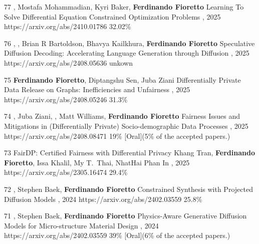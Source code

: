 \begin{pubs}


\confentry
	{77}
	{, Mostafa Mohammadian, Kyri Baker, {\bf Ferdinando Fioretto}}
	{Learning To Solve Differential Equation Constrained Optimization Problems}
	{\procICLR, 2025}
	{https://arxiv.org/abs/2410.01786}
	{32.02\%} %

\confentry
	{76}
	{, , Brian R Bartoldson, Bhavya Kailkhura, {\bf Ferdinando Fioretto}}
	{Speculative Diffusion Decoding: Accelerating Language Generation through Diffusion}
	{\procNAACL, 2025}
	{https://arxiv.org/abs/2408.05636}
	{unkown}

\confentry
	{75}
	{{\bf Ferdinando Fioretto}, Diptangshu Sen, Juba Ziani}
	{Differentially Private Data Release on Graphs: Inefficiencies and Unfairness}
	{\procAISTATS, 2025}
	{https://arxiv.org/abs/2408.05246}
	{31.3\%} %

\confentryAwd
	{74}
	{, Juba Ziani, , Matt Williams, {\bf Ferdinando Fioretto}}
	{Fairness Issues and Mitigations in (Differentially Private) Socio-demographic Data Processes}
	{\procAAAI, 2025}
	{https://arxiv.org/abs/2408.08471}
	{19\%} %
	{[Oral]}{(5\% of the accepted papers.)}

\confentry
	{73}
	{FairDP: Certified Fairness with Differential Privacy}
	{Khang Tran, {\bf Ferdinando Fioretto}, Issa Khalil, My T.~Thai, NhatHai Phan}
	{In , 2025}
	{https://arxiv.org/abs/2305.16474}
	{29.4\%}%


\confentry
	{72}
	{, Stephen Baek, {\bf Ferdinando Fioretto}}
  	{Constrained Synthesis with Projected Diffusion Models}
  	{\procNeurIPS, 2024}
	{https://arxiv.org/abs/2402.03559}
	{25.8\%}

\confentryAwd
	{71}
	{, Stephen Baek, {\bf Ferdinando Fioretto}}
  	{Physics-Aware Generative Diffusion Models for Micro-structure Material Design}
  	{, 2024}
	{https://arxiv.org/abs/2402.03559}
	{39\%}
	{[Oral]}{(6\% of the accepted papers.)}


\end{pubs}
